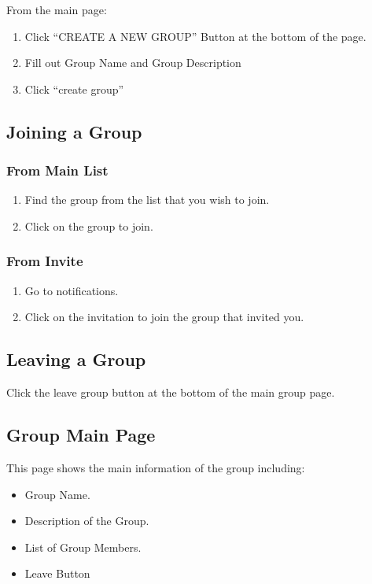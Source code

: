  From the main page:
 
 \begin{enumerate}
 \item Click ``CREATE A NEW GROUP'' Button at the bottom of the page.
 \item Fill out Group Name and Group Description
 \item Click ``create group''
 \end{enumerate}
 
 
 \subsection{Joining a Group}
 \subsubsection{From Main List}
 \begin{enumerate}
 \item Find the group from the list that you wish to join.
 \item Click on the group to join.
 \end{enumerate}
 
 \subsubsection{From Invite}
 \begin{enumerate}
 \item Go to notifications.
 \item Click on the invitation to join the group that invited you.
 \end{enumerate}
 
 
 \subsection{Leaving a Group}
 Click the leave group button at the bottom of the main group page.
 
 \subsection{Group Main Page}
 This page shows the main information of the group including:\\
 	\begin{itemize}
 	\item Group Name.
 	\item Description of the Group.
 	\item List of Group Members.
 	\item Leave Button
 	\end{itemize}
 
